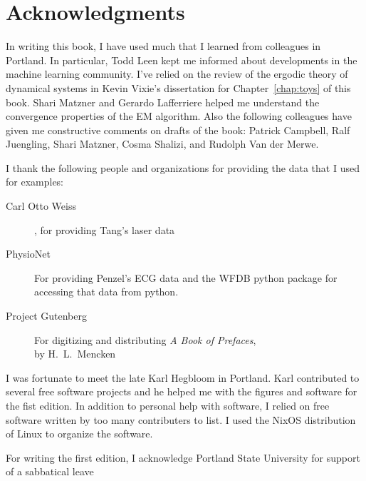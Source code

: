 \documentclass[ltxbook,showlabels, commentsvisible]{hmmdsbook}
\begin{document}
\section*{Acknowledgments}
%
\label{sec:ack}
\longpage%

In writing this book, I have used much that I learned from colleagues
in Portland.  In particular, Todd Leen kept me informed about
developments in the machine learning community.  I've relied on the
review of the ergodic theory of dynamical systems in Kevin Vixie's
dissertation\cite{vixie02} for Chapter~\ref{chap:toys} of this book.
Shari Matzner and Gerardo Lafferriere helped me understand the
convergence properties of the EM algorithm.  Also the following
colleagues have given me constructive comments on drafts of the book:
% 
Patrick Campbell, %
Ralf Juengling, %
Shari Matzner, %
Cosma Shalizi, %
and %
Rudolph Van der Merwe. %

I thank the following people and organizations for providing the data
that I used for examples:
\begin{description}
\item[Carl Otto Weiss], for providing Tang's\cite{Tang92} laser data
\item[PhysioNet\cite{PhysioNet}] For providing Penzel's\cite{Penzel02}
  ECG data and the WFDB python package\cite{WFDB-python} for accessing
  that data from python.
\item[Project Gutenberg] For digitizing and distributing \emph{A
    Book of Prefaces},\\ by H.~L.~Mencken
\end{description}

I was fortunate to meet the late Karl Hegbloom in Portland.  Karl
contributed to several free software projects and he helped me with
the figures and software for the fist edition.  In addition to
personal help with software, I relied on free software written by too
many contributers to list.  I used the NixOS distribution of Linux to
organize the software.

For writing the first edition, I acknowledge Portland State University
for support of a sabbatical leave
%


\tableofcontents
\end{document}
